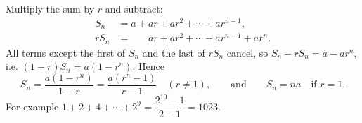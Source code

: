 Multiply the sum by $r$ and subtract:
\begin{align*}
S_n&=a+ar+ar^2+\cdots+ar^{n-1},\\
rS_n&=\phantom{a+{}}ar+ar^2+\cdots+ar^{n-1}+ar^n.
\end{align*}
All terms except the first of $S_n$ and the last of $rS_n$ cancel, so $S_n-rS_n=a-ar^n$, i.e. $(1-r)S_n=a\left(1-r^n\right)$. Hence
\[\boxed{S_n=\dfrac{a\left(1-r^n\right)}{1-r}=\dfrac{a\left(r^n-1\right)}{r-1}\quad(r\ne1)},\qquad\text{and}\qquad S_n=na\quad\text{if }r=1.\]
For example $1+2+4+\cdots+2^9=\dfrac{2^{10}-1}{2-1}=1023$.
